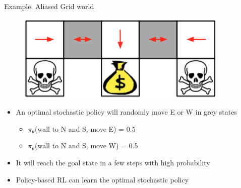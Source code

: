     \begin{frame}{Example: Aliased Grid world}
        \begin{figure}
        \centering
        \includegraphics[width=0.9\textwidth,height=0.3\textheight,keepaspectratio]{images/policy-search/grid_world_3.png}
    \end{figure}

    \begin{itemize}
        \item An optimal stochastic policy will randomly move E or W in grey states
        \begin{itemize}
            \item $\pi_\theta$(wall to N and S, move E) = 0.5
            \item $\pi_\theta$(wall to N and S, move W) = 0.5
        \end{itemize}
        \pause
        \item It will reach the goal state in a few steps with high probability
        \pause
        \item Policy-based RL can learn the optimal stochastic policy
    \end{itemize}
\end{frame}